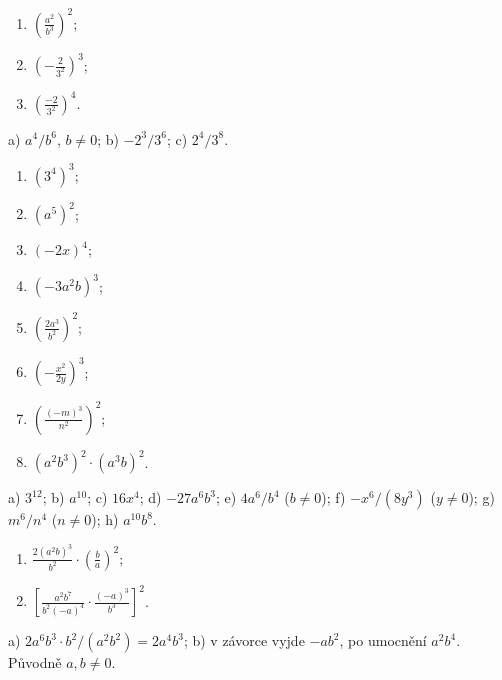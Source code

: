 \documentclass[11pt,a4paper]{article}
\begin{document}
\begin{prikladReseniBox}[title={Příklad 2 — tři úlohy z předlohy},breakable=false]
\begin{enumerate}[label=\alph*)]
\item $\left(\frac{a^2}{b^3}\right)^2$;
\item $\left(-\frac{2}{3^2}\right)^3$;
\item $\left(\frac{-2}{3^2}\right)^4$.
\end{enumerate}
\tcblower
 a) $a^4/b^6$, $b\ne0$;
 b) $-2^3/3^6$; c) $2^4/3^8$.
\end{prikladReseniBox}
\begin{zadaniReseniBox}[title={Samostatná práce 2 — osm úprav}]
\begin{enumerate}[label=\alph*)]
\item $(3^4)^3$; \item $(a^5)^2$; \item $(-2x)^4$;
\item $(-3a^2b)^3$; \item $\left(\frac{2a^3}{b^2}\right)^2$;
\item $\left(-\frac{x^2}{2y}\right)^3$;
\item $\left(\frac{(-m)^3}{n^2}\right)^2$;
\item $(a^2b^3)^2\cdot(a^3b)^2$.
\end{enumerate}
\tcblower
 a) $3^{12}$; b) $a^{10}$; c) $16x^4$;
 d) $-27a^6b^3$; e) $4a^6/b^4$ ($b\ne0$);
 f) $-x^6/(8y^3)$ ($y\ne0$);
 g) $m^6/n^4$ ($n\ne0$); h) $a^{10}b^8$.
\end{zadaniReseniBox}
\begin{zadaniReseniBox}[title={Rozšiřující příklad 2 — složené zlomky z předlohy}]
\begin{enumerate}[label=\alph*)]
\item $\frac{2(a^2b)^3}{b^2}\cdot\left(\frac ba\right)^2$;
\item $\left[\frac{a^2b^7}{b^2(-a)^4}\cdot\frac{(-a)^3}{b^3}\right]^2$.
\end{enumerate}
\tcblower
 a) $2a^6b^3\cdot b^2/(a^2b^2)=\boxed{2a^4b^3}$;
 b) v závorce vyjde $-ab^2$, po umocnění $\boxed{a^2b^4}$.
Původně $a,b\ne0$.
\end{zadaniReseniBox}
\end{document}
